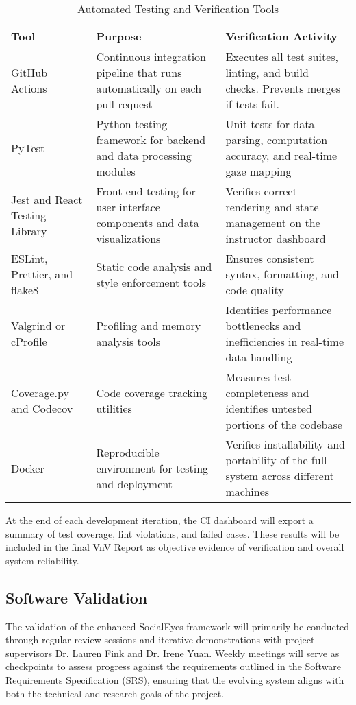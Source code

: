 \documentclass[12pt, titlepage]{article}
\begin{document}
\begin{table}[htbp]
\centering
\caption{Automated Testing and Verification Tools}
\begin{tabularx}{\textwidth}{|p{3cm}|p{4cm}|X|}
\hline
\textbf{Tool} & \textbf{Purpose} & \textbf{Verification Activity} \\
\hline
GitHub Actions & Continuous integration pipeline that runs automatically on each pull request & Executes all test suites, linting, and build checks. Prevents merges if tests fail. \\
\hline
PyTest & Python testing framework for backend and data processing modules & Unit tests for data parsing, computation accuracy, and real-time gaze mapping \\
\hline
Jest and React Testing Library & Front-end testing for user interface components and data visualizations & Verifies correct rendering and state management on the instructor dashboard \\
\hline
ESLint, Prettier, and flake8 & Static code analysis and style enforcement tools & Ensures consistent syntax, formatting, and code quality \\
\hline
Valgrind or cProfile & Profiling and memory analysis tools & Identifies performance bottlenecks and inefficiencies in real-time data handling \\
\hline
Coverage.py and Codecov & Code coverage tracking utilities & Measures test completeness and identifies untested portions of the codebase \\
\hline
Docker & Reproducible environment for testing and deployment & Verifies installability and portability of the full system across different machines \\
\hline
\end{tabularx}
\end{table}

At the end of each development iteration, the CI dashboard will export a summary of test coverage, lint violations, and failed cases. These results will be included in the final VnV Report as objective evidence of verification and overall system reliability.

\subsection{Software Validation}

The validation of the enhanced SocialEyes framework will primarily be conducted through regular review sessions and iterative demonstrations with project supervisors Dr. Lauren Fink and Dr. Irene Yuan. Weekly meetings will serve as checkpoints to assess progress against the requirements outlined in the Software Requirements Specification (SRS), ensuring that the evolving system aligns with both the technical and research goals of the project.
\newline
\end{document}
